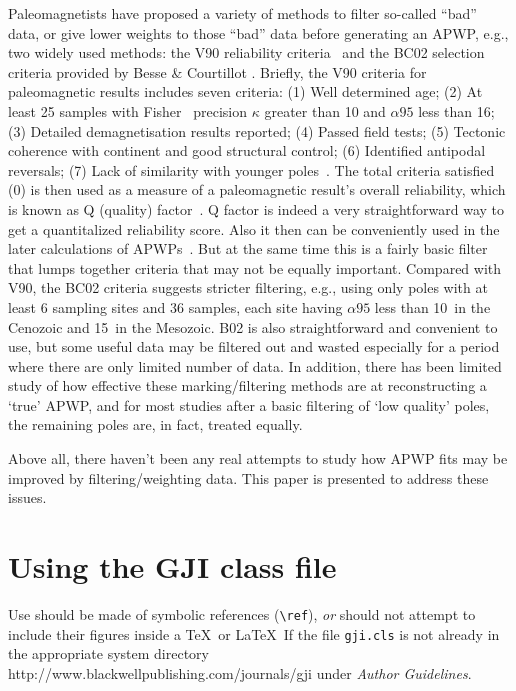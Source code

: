 Paleomagnetists have proposed a variety of methods
to filter so-called ``bad'' data, or give lower weights to those ``bad'' data
before generating an APWP, e.g., two widely used methods: the V90 reliability
criteria~\cite{v90} and the BC02 selection criteria provided by Besse \&
Courtillot . Briefly, the V90 criteria for paleomagnetic results
includes seven criteria: (1) Well determined age; (2) At least 25 samples with
Fisher~\cite{F53} precision $\kappa$ greater than 10 and $\alpha95$ less than
16\degree; (3) Detailed demagnetisation results reported; (4) Passed field
tests; (5) Tectonic coherence with continent and good structural control; (6)
Identified antipodal reversals; (7) Lack of similarity with younger
poles~\cite{T92}. The total criteria satisfied (0) is then used as
a measure of a paleomagnetic result's overall reliability, which is known as Q
(quality) factor~\cite{T92}. Q factor is indeed a very straightforward way to
get a quantitalized reliability score. Also it then can be conveniently used in
the later calculations of APWPs~\cite{T92}. But at the same time this is a
fairly basic filter that lumps together criteria that may not be equally
important. Compared with V90, the BC02 criteria suggests stricter filtering,
e.g., using only poles with at least 6 sampling sites and 36 samples, each site
having $\alpha95$ less than 10\degree\ in the Cenozoic and 15\degree\ in the
Mesozoic. B02 is also straightforward and convenient to use, but some useful
data may be filtered out and wasted especially for a period where there are
only limited number of data. In addition, there has been limited study of how
effective these marking/filtering methods are at reconstructing a `true' APWP,
and for most studies after a basic filtering of `low quality' poles, the
remaining poles are, in fact, treated equally.

Above all, there haven't been any real attempts to study how APWP fits may be
improved by filtering/weighting data. This paper is presented to address these
issues.



\section{Using the GJI class file}

Use should be made of symbolic references (\verb"\ref"),  {\em or\/}
should not attempt to include their figures inside a \TeX\ or \LaTeX\
If the file \verb"gji.cls" is not already in the appropriate system directory
http://www.blackwellpublishing.com/journals/gji under {\em Author Guidelines}.

